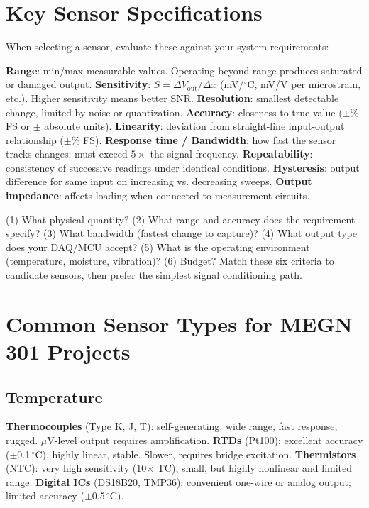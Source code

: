 \documentclass[11pt,letterpaper,twoside,openany]{book}
\newcommand{\degC}{\ensuremath{{}^{\circ}\text{C}}}
\begin{document}
\section{Key Sensor Specifications}
When selecting a sensor, evaluate these against your system requirements:

\textbf{Range}: min/max measurable values. Operating beyond range produces saturated or damaged output. \textbf{Sensitivity}: $S = \Delta V_{\text{out}}/\Delta x$ (mV/\degC{}, mV/V per microstrain, etc.). Higher sensitivity means better SNR. \textbf{Resolution}: smallest detectable change, limited by noise or quantization. \textbf{Accuracy}: closeness to true value ($\pm$\% FS or $\pm$ absolute units). \textbf{Linearity}: deviation from straight-line input-output relationship ($\pm$\% FS). \textbf{Response time / Bandwidth}: how fast the sensor tracks changes; must exceed $5\times$ the signal frequency. \textbf{Repeatability}: consistency of successive readings under identical conditions. \textbf{Hysteresis}: output difference for same input on increasing vs. decreasing sweeps. \textbf{Output impedance}: affects loading when connected to measurement circuits.

\begin{keyconceptbox}
(1) What physical quantity? (2) What range and accuracy does the requirement specify? (3) What bandwidth (fastest change to capture)? (4) What output type does your DAQ/MCU accept? (5) What is the operating environment (temperature, moisture, vibration)? (6) Budget? Match these six criteria to candidate sensors, then prefer the simplest signal conditioning path.
\end{keyconceptbox}

\section{Common Sensor Types for MEGN 301 Projects}

\subsection{Temperature}
\textbf{Thermocouples} (Type K, J, T): self-generating, wide range, fast response, rugged. $\mu$V-level output requires amplification. \textbf{RTDs} (Pt100): excellent accuracy ($\pm$0.1\,\degC{}), highly linear, stable. Slower, requires bridge excitation. \textbf{Thermistors} (NTC): very high sensitivity (10$\times$ TC), small, but highly nonlinear and limited range. \textbf{Digital ICs} (DS18B20, TMP36): convenient one-wire or analog output; limited accuracy ($\pm$0.5\,\degC{}).
\end{document}
